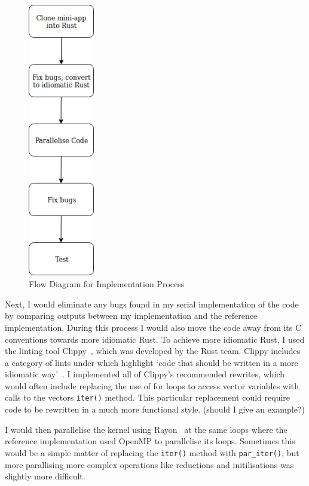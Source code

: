 \begin{figure}
  \center
  \includegraphics[height=12cm]{figs/ImplementationFlow.png}
  \caption{Flow Diagram for Implementation Process}
  \label{fig:imp-flow}
\end{figure}

Next, I would eliminate any bugs found in my serial implementation of the code by comparing outputs between my implementation and the reference implementation. During this process I would also move the code away from its C conventions towards more idiomatic Rust. To achieve more idiomatic Rust, I used the linting tool Clippy~\cite{RustClippy}, which was developed by the Rust team.  Clippy includes a category of lints under  which highlight `code that should be written in a more idiomatic way'~\cite{RustClippy}. I implemented all of Clippy's recommended rewrites, which would often include replacing the use of for loops to access vector variables with calls to the vectors \texttt{iter()} method. This particular replacement could require code to be rewritten in a much more functional style. (should I give an example?)

I would then parallelise the kernel using Rayon~\cite{RustRayon} at the same loops where the reference implementation used OpenMP to parallelise its loops. Sometimes this would be a simple matter of replacing the \texttt{iter()} method with \texttt{par_iter()}, but more parallising more complex operations like reductions and initilisations was slightly more difficult.


